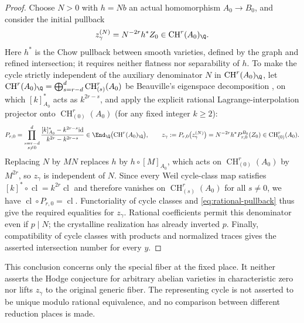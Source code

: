 \begin{proof}
Choose \(N>0\) with \(h=Nb\) an actual homomorphism
\(A_0\to B_0\), and consider the initial pullback
\[
 z_\gamma^{(N)}=N^{-2r}h^*Z_0\in\operatorname{CH}^r(A_0)_{\Q}.
\]
Here \(h^*\) is the Chow pullback between smooth varieties, defined
by the graph and refined intersection; it requires neither flatness
nor separability of \(h\). To make the cycle strictly independent of
the auxiliary denominator \(N\) in \(\operatorname{CH}^r(A_0)_{\Q}\),
let \(\operatorname{CH}^r(A_0)_{\Q}=\bigoplus_{s=r-d}^{d}
\operatorname{CH}^r_{(s)}(A_0)\) be Beauville's eigenspace
decomposition \cite[Proposition~2]{Beauville1986}, on which
\([k]_{A_0}^*\) acts as \(k^{2r-s}\), and apply the explicit rational
Lagrange-interpolation projector onto \(\operatorname{CH}^r_{(0)}(A_0)\)
(for any fixed integer \(k\ge2\)):
\[
 P_{r,0}=\prod_{\substack{s=r-d\\ s\ne0}}^{d}
   \frac{[k]_{A_0}^*-k^{2r-s}\mathrm{id}}{k^{2r}-k^{2r-s}}
 \in\End_{\Q}\bigl(\operatorname{CH}^r(A_0)_{\Q}\bigr),\qquad
 z_\gamma:=P_{r,0}\bigl(z_\gamma^{(N)}\bigr)
         =N^{-2r}h^*P_{r,0}^{B_0}(Z_0)
         \in\operatorname{CH}^r_{(0)}(A_0).
\]
Replacing \(N\) by \(MN\) replaces \(h\) by \(h\circ[M]_{A_0}\), which
acts on \(\operatorname{CH}^r_{(0)}(A_0)\) by \(M^{2r}\), so
\(z_\gamma\) is independent of \(N\). Since every Weil cycle-class
map satisfies \([k]^*\circ\operatorname{cl}=k^{2r}\operatorname{cl}\)
and therefore vanishes on \(\operatorname{CH}^r_{(s)}(A_0)\) for all
\(s\ne0\), we have \(\operatorname{cl}\circ P_{r,0}=\operatorname{cl}\).
Functoriality of cycle classes and
\eqref{eq:rational-pullback} thus give the required equalities for
\(z_\gamma\). Rational
coefficients permit this denominator even if \(p\mid N\); the
crystalline realization has already inverted \(p\). Finally,
compatibility of cycle classes with products and normalized traces
gives the asserted intersection number for every \(y\).
\end{proof}

This conclusion concerns only the special fiber at the fixed place.
It neither asserts the Hodge conjecture for arbitrary abelian varieties
in characteristic zero nor lifts \(z_\gamma\) to the original
generic fiber. The representing cycle is not asserted to be unique
modulo rational equivalence, and no comparison between different
reduction places is made.
